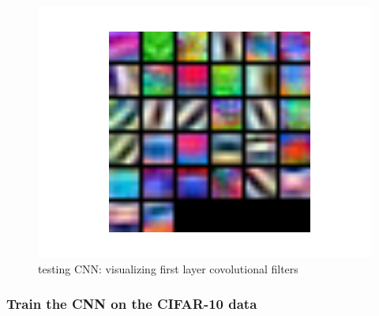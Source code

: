 \documentclass{article}
\begin{document}
\begin{figure}[H]
\centering
\includegraphics[width=1.0\linewidth]{./figure_3_2_5b}
\caption{testing CNN: visualizing first layer covolutional filters}
\label{fig:3_2_5}
\end{figure}

\subsubsection{Train the CNN on the CIFAR-10 data}
\end{document}
